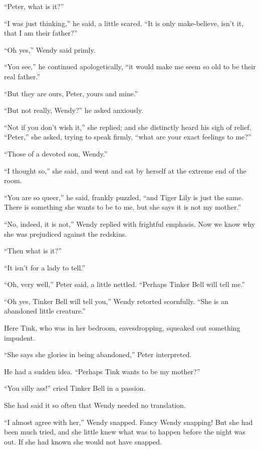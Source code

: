 “Peter, what is it?”

“I was just thinking,” he said, a little scared.
“It is only make‐believe, isn’t it, that I am their father?”

“Oh yes,” Wendy said primly.

“You see,” he continued apologetically,
“it would make me seem so old to be their real father.”

“But they are ours, Peter, yours and mine.”

“But not really, Wendy?\@” he asked anxiously.

“Not if you don’t wish it,” she replied;
and she distinctly heard his sigh of relief.
“Peter,” she asked, trying to speak firmly,
“what are your exact feelings to me?”

“Those of a devoted son, Wendy.”

“I thought so,” she said,
and went and sat by herself at the extreme end of the room.

“You are so queer,” he said, frankly puzzled, “and Tiger Lily is just the same.
There is something she wants to be to me, but she says it is not my mother.”

“No, indeed, it is not,” Wendy replied with frightful emphasis.
Now we know why she was prejudiced against the redskins.

“Then what is it?”

“It isn’t for a lady to tell.”

“Oh, very well,” Peter said, a little nettled.
“Perhaps Tinker Bell will tell me.”

“Oh yes, Tinker Bell will tell you,” Wendy retorted scornfully.
“She is an abandoned little creature.”

Here Tink, who was in her bedroom, eavesdropping,
squeaked out something impudent.

“She says she glories in being abandoned,” Peter interpreted.

He had a sudden idea.
“Perhaps Tink wants to be my mother?”

“You silly ass!\@” cried Tinker Bell in a passion.

She had said it so often that Wendy needed no translation.

“I almost agree with her,” Wendy snapped.
Fancy Wendy snapping!
But she had been much tried,
and she little knew what was to happen before the night was out.
If she had known she would not have snapped.

